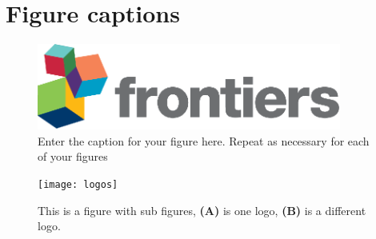 \documentclass[utf8]{frontiersSCNS} %
\begin{document}

\section*{Figure captions}


\begin{figure}[h!]
\begin{center}
\includegraphics[width=10cm]{logo1}%
\end{center}
\caption{ Enter the caption for your figure here.  Repeat as  necessary for each of your figures}\label{fig:1}
\end{figure}


\begin{figure}[h!]
\begin{center}
\texttt{[image: logos]}
\end{center}
\caption{This is a figure with sub figures, \textbf{(A)} is one logo, \textbf{(B)} is a different logo.}\label{fig:2}
\end{figure}

\end{document}
